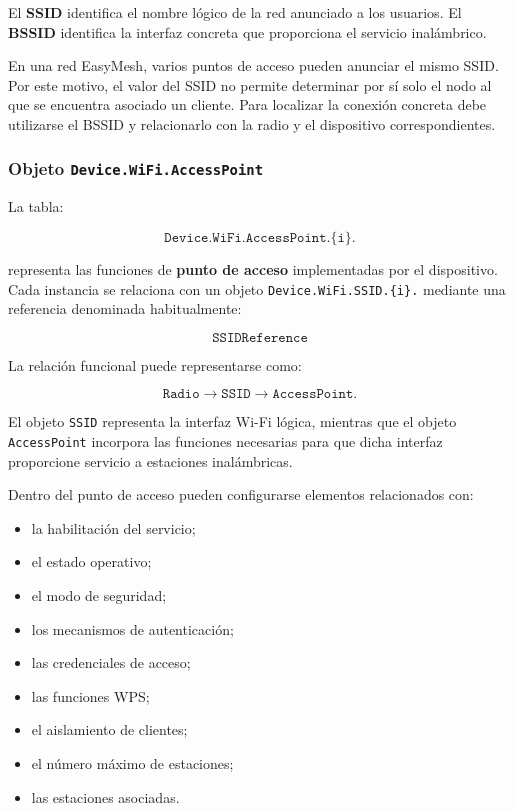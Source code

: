 El \textbf{SSID} identifica el nombre lógico de la red anunciado a los
usuarios. El \textbf{BSSID} identifica la interfaz concreta que
proporciona el servicio inalámbrico.

En una red EasyMesh, varios puntos de acceso pueden anunciar el mismo
SSID. Por este motivo, el valor del SSID no permite determinar por sí
solo el nodo al que se encuentra asociado un cliente. Para localizar la
conexión concreta debe utilizarse el BSSID y relacionarlo con la radio y
el dispositivo correspondientes.


\subsubsection*{Objeto \texttt{Device.WiFi.AccessPoint}}

La tabla:

\[
    \texttt{Device.WiFi.AccessPoint.\{i\}.}
\]

representa las funciones de \textbf{punto de acceso} implementadas por el
dispositivo. Cada instancia se relaciona con un objeto
\texttt{Device.WiFi.SSID.\{i\}.} mediante una referencia denominada
habitualmente:

\[
    \texttt{SSIDReference}
\]

La relación funcional puede representarse como:

\[
    \texttt{Radio}
    \longrightarrow
    \texttt{SSID}
    \longrightarrow
    \texttt{AccessPoint}.
\]

El objeto \texttt{SSID} representa la interfaz Wi-Fi lógica, mientras que
el objeto \texttt{AccessPoint} incorpora las funciones necesarias para
que dicha interfaz proporcione servicio a estaciones inalámbricas.

Dentro del punto de acceso pueden configurarse elementos relacionados
con:

\begin{itemize}
    \item la habilitación del servicio;
    \item el estado operativo;
    \item el modo de seguridad;
    \item los mecanismos de autenticación;
    \item las credenciales de acceso;
    \item las funciones WPS;
    \item el aislamiento de clientes;
    \item el número máximo de estaciones;
    \item las estaciones asociadas.
\end{itemize}

